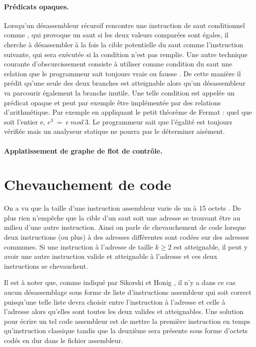 \paragraph{Prédicats opaques.}
Lorsqu'un désassembleur récursif rencontre une instruction de saut conditionnel comme \je, qui provoque un saut si les deux valeurs comparées sont égales, il cherche à désassembler à la fois la cible potentielle du saut comme l'instruction suivante, qui sera exécutée si la condition n'est pas remplie.
Une autre technique courante d'obscurcissement consiste à utiliser comme condition du saut une relation que le programmeur sait toujours vraie ou fausse \cite{MKK07}. De cette manière il prédit qu'une seule des deux branches est atteignable alors qu'un désassembleur va parcourir également la branche inutile.
Une telle condition est appelée un prédicat opaque et peut par exemple être implémentée par des relations d'arithmétique. Par exemple en appliquant le petit théorème de Fermat \cite{fermat} : quel que soit l'entier e, $e^3\ =\ e\ mod\ 3$.
Le programmeur sait que l'égalité est toujours vérifiée mais un analyseur statique ne pourra pas le déterminer aisément.

\paragraph{Applatissement de graphe de flot de contrôle.}

\section{Chevauchement de code}
On a vu que la taille d'une instruction assembleur varie de un à 15 octets .
De plus rien n'empêche que la cible d'un saut soit une adresse se trouvant être au milieu d'une autre instruction.
Ainsi on parle de chevauchement de code lorsque deux instructions (ou plus) à des adresses différentes sont codées sur des adresses communes. Si une instruction à l'adresse  de taille $k\geq 2$ est atteignable, il peut y avoir une autre instruction valide et atteignable à l'adresse  et ces deux instructions se chevauchent.

Il est à noter que, comme indiqué par Sikorski et Honig \cite{PMA}, il n'y a dans ce cas aucun désassemblage sous forme de liste d'instructions assembleur qui soit correct puisqu'une telle liste devra choisir entre l'instruction à l'adresse  et celle à l'adresse  alors qu'elles sont toutes les deux valides et atteignables. Une solution pour écrire un tel code assembleur est de mettre la première instruction en temps qu'instruction classique tandis que la deuxième sera présente sous forme d'octets codés en dur dans le fichier assembleur.

